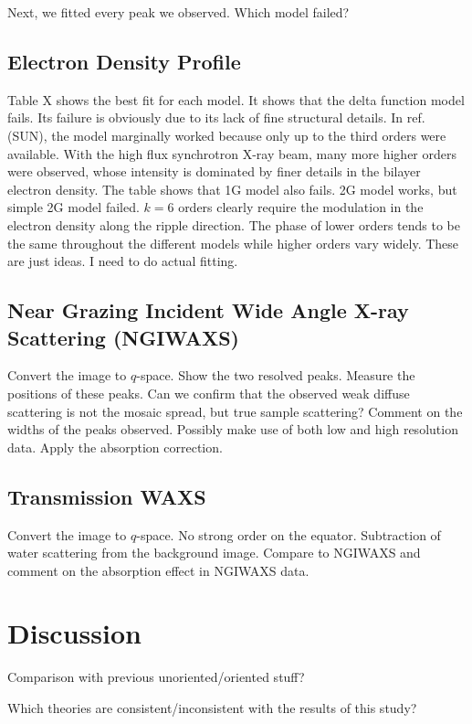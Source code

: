 Next, we fitted every peak we observed. Which model failed?

\subsection{Electron Density Profile}
Table X shows the best fit for each model. It shows that the delta function
model fails. Its failure is obviously due to its lack of fine structural 
details. In ref. (SUN), the model marginally worked because only up to
the third orders were available. With the high flux synchrotron X-ray beam,
many more higher orders were observed, whose intensity is dominated by
finer details in the bilayer electron density. The table shows that
1G model also fails. 2G model works, but simple 2G model failed. $k=6$ orders
clearly require the modulation in the electron density along the ripple 
direction. The phase of lower orders tends to be the same throughout
the different models while higher orders vary widely. These are just ideas.
I need to do actual fitting.

\subsection{Near Grazing Incident Wide Angle X-ray Scattering (NGIWAXS)}
Convert the image to $q$-space. Show the two resolved peaks.
Measure the positions of these peaks. Can we confirm  that
the observed weak diffuse scattering is not the mosaic spread, but
true sample scattering? Comment on the widths of the peaks observed.
Possibly make use of both low and high resolution data.
Apply the absorption correction.

\subsection{Transmission WAXS}
Convert the image to $q$-space.
No strong order on the equator. Subtraction of water scattering from the
background image. Compare to NGIWAXS and comment on the absorption effect
in NGIWAXS data.

\section{Discussion}
Comparison with previous unoriented/oriented stuff?

Which theories are consistent/inconsistent with the results of this study?


